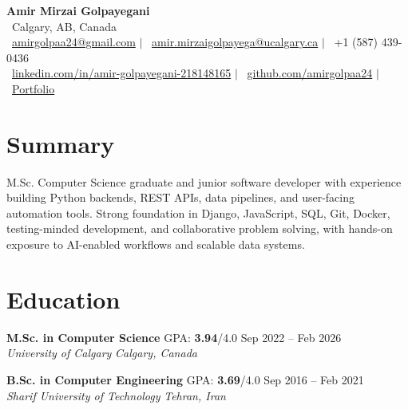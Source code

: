 \documentclass[a4paper,10pt]{article}
\newcommand{\resumeEducationSubheading}[5]{
    \textbf{#1} \hfill #2 \hfill #3 \\
    \textit{#4} \hfill \textit{#5}
}
\begin{document}

\begin{center}
    {\LARGE \textbf{Amir Mirzai Golpayegani}} \\[0.25em]
    \faMapMarker*~Calgary, AB, Canada \\[0.25em]
    \faEnvelope~\href{mailto:amirgolpaa24@gmail.com}{amirgolpaa24@gmail.com}
    $|$
    \faEnvelope~\href{mailto:amir.mirzaigolpayega@ucalgary.ca}{amir.mirzaigolpayega@ucalgary.ca}
    $|$
    \faPhone*~+1 (587) 439-0436 \\[0.25em]
    \faLinkedin~\href{https://linkedin.com/in/amir-golpayegani-218148165}{linkedin.com/in/amir-golpayegani-218148165}
    $|$
    \faGithub~\href{https://github.com/amirgolpaa24}{github.com/amirgolpaa24}
    $|$
    \faGlobe~\href{https://amir-portfolio-navy.vercel.app/}{Portfolio}
\end{center}


\section*{Summary}

M.Sc. Computer Science graduate and junior software developer with experience building Python backends, REST APIs, data pipelines, and user-facing automation tools. Strong foundation in Django, JavaScript, SQL, Git, Docker, testing-minded development, and collaborative problem solving, with hands-on exposure to AI-enabled workflows and scalable data systems.


\section*{Education}

\resumeEducationSubheading
{M.Sc. in Computer Science}
{GPA: \textbf{3.94}/4.0}
{Sep 2022 -- Feb 2026}
{University of Calgary}
{Calgary, Canada}

\vspace{0.35em}

\resumeEducationSubheading
{B.Sc. in Computer Engineering}
{GPA: \textbf{3.69}/4.0}
{Sep 2016 -- Feb 2021}
{Sharif University of Technology}
{Tehran, Iran}

\end{document}
